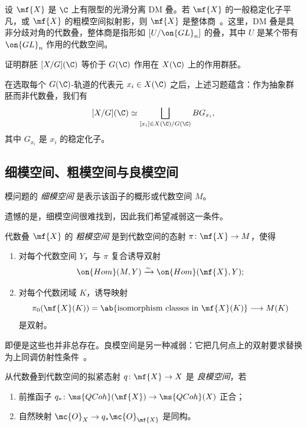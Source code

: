 \begin{exm}
    设 \(\mf{X}\) 是 \(\C\) 上有限型的光滑分离 DM 叠。若 \(\mf{X}\) 的一般稳定化子平凡，或 \(\mf{X}\) 的粗模空间拟射影，则 \(\mf{X}\) 是整体商~\cite{EHKV2001}。这里，DM 叠是具非分歧对角的代数叠，整体商是指形如 \([U/\on{GL}_n]\) 的叠，其中 \(U\) 是某个带有 \(\on{GL}_n\) 作用的代数空间。
\end{exm}

\begin{exer}
    证明群胚 \([X/G](\C)\) 等价于 \(G(\C)\) 作用在 \(X(\C)\) 上的作用群胚。
\end{exer}

在选取每个 \(G(\C)\)-轨道的代表元 \(x_i\in X(\C)\) 之后，上述习题蕴含：作为抽象群胚而非代数叠，我们有
\[ 
    [X/G](\C) \simeq \bigsqcup_{[x_i] \in X(\C)/G(\C)} BG_{x_i}, 
\]
其中 \(G_{x_i}\) 是 \(x_i\) 的稳定化子。


\subsection{细模空间、粗模空间与良模空间}%
\label{sub:Fine vs coarse vs good moduli spaces}

\begin{defn}
    模问题的 \textit{细模空间} 是表示该函子的概形或代数空间 \(M\)。
\end{defn}

遗憾的是，细模空间很难找到，因此我们希望减弱这一条件。

\begin{defn}
    代数叠 \(\mf{X}\) 的 \textit{粗模空间} 是到代数空间的态射 \(\pi\colon\mf{X}\to M\)，使得
    \begin{enumerate}
        \item 对每个代数空间 \(Y\)，与 \(\pi\) 复合诱导双射
        \[
            \on{Hom}(M,Y)\xrightarrow{\sim}\on{Hom}(\mf{X},Y);
        \]
        \item 对每个代数闭域 \(K\)，诱导映射
        \[
            \pi_0(\mf{X}(K))=\ab\{\text{isomorphism classes in }\mf{X}(K)\}
            \longrightarrow M(K)
        \]
        是双射。
    \end{enumerate}
\end{defn}


即便是这些也并非总存在。良模空间是另一种减弱：它把几何点上的双射要求替换为上同调仿射性条件~\cite{Alper2013}。

\begin{defn}
    从代数叠到代数空间的拟紧态射 \(q\colon\mf{X}\to X\) 是 \textit{良模空间}，若
    \begin{enumerate}
        \item 前推函子 \(q_*\colon\ms{QCoh}(\mf{X})\to\ms{QCoh}(X)\) 正合；
        \item 自然映射 \(\mc{O}_X\to q_*\mc{O}_{\mf{X}}\) 是同构。
    \end{enumerate}
\end{defn}

